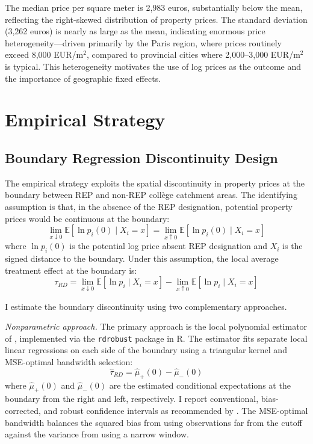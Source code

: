 \documentclass[12pt]{article}
\newcommand{\E}{\mathbb{E}}
\begin{document}
The median price per square meter is 2,983 euros, substantially below the mean, reflecting the right-skewed distribution of property prices. The standard deviation (3,262 euros) is nearly as large as the mean, indicating enormous price heterogeneity---driven primarily by the Paris region, where prices routinely exceed 8,000 EUR/m$^2$, compared to provincial cities where 2,000--3,000 EUR/m$^2$ is typical. This heterogeneity motivates the use of log prices as the outcome and the importance of geographic fixed effects.


\section{Empirical Strategy}\label{sec:strategy}

\subsection{Boundary Regression Discontinuity Design}

The empirical strategy exploits the spatial discontinuity in property prices at the boundary between REP and non-REP coll\`{e}ge catchment areas. The identifying assumption is that, in the absence of the REP designation, potential property prices would be continuous at the boundary:
\begin{equation}
\lim_{x \downarrow 0} \E[\ln p_i(0) \mid X_i = x] = \lim_{x \uparrow 0} \E[\ln p_i(0) \mid X_i = x]
\end{equation}
where $\ln p_i(0)$ is the potential log price absent REP designation and $X_i$ is the signed distance to the boundary. Under this assumption, the local average treatment effect at the boundary is:
\begin{equation}
\tau_{RD} = \lim_{x \downarrow 0} \E[\ln p_i \mid X_i = x] - \lim_{x \uparrow 0} \E[\ln p_i \mid X_i = x]
\end{equation}

I estimate the boundary discontinuity using two complementary approaches.

\textit{Nonparametric approach.} The primary approach is the local polynomial estimator of \citet{calonico2014}, implemented via the \texttt{rdrobust} package in R. The estimator fits separate local linear regressions on each side of the boundary using a triangular kernel and MSE-optimal bandwidth selection:
\begin{equation}
\hat{\tau}_{RD} = \hat{\mu}_+(0) - \hat{\mu}_-(0)
\end{equation}
where $\hat{\mu}_+(0)$ and $\hat{\mu}_-(0)$ are the estimated conditional expectations at the boundary from the right and left, respectively. I report conventional, bias-corrected, and robust confidence intervals as recommended by \citet{calonico2014}. The MSE-optimal bandwidth balances the squared bias from using observations far from the cutoff against the variance from using a narrow window.
\end{document}
